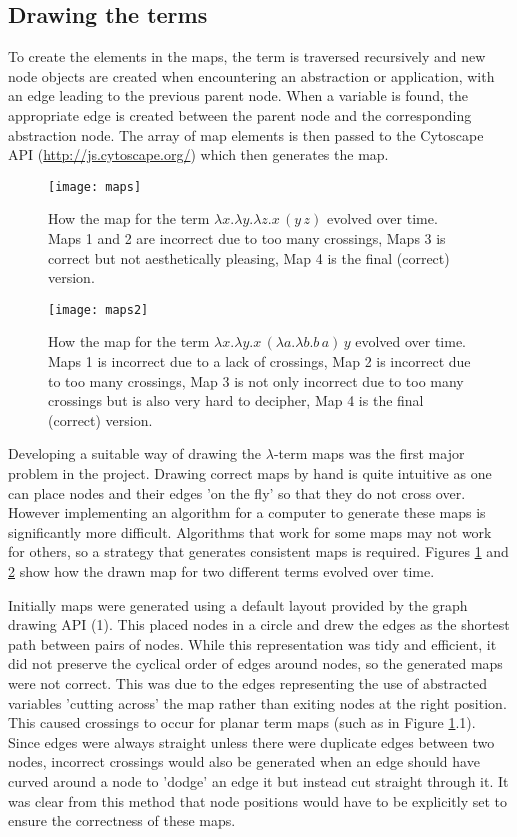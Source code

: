 \documentclass[11pt]{article}
\begin{document}
\subsection{Drawing the terms}

To create the elements in the maps, the term is traversed recursively and new node objects are created when encountering an abstraction or application, with an edge leading to the previous parent node. When a variable is found, the appropriate edge is created between the parent node and the corresponding abstraction node. The array of map elements is then passed to the Cytoscape API (\url{http://js.cytoscape.org/}) which then generates the map.

\begin{figure}
    \centering
    \texttt{[image: maps]}
    \caption{How the map for the term $\lambda x. \lambda y. \lambda z. x \, (y \, z)$ evolved over time. Maps 1 and 2 are incorrect due to too many crossings, Maps 3 is correct but not aesthetically pleasing, Map 4 is the final (correct) version.}
    \label{fig:drawn_maps}
\end{figure}

\begin{figure}
    \centering
    \texttt{[image: maps2]}
    \caption{How the map for the term $\lambda x. \lambda y. x \, (\lambda a. \lambda b. b \, a) \, y$ evolved over time. Maps 1 is incorrect due to a lack of crossings, Map 2 is incorrect due to too many crossings, Map 3 is not only incorrect due to too many crossings but is also very hard to decipher, Map 4 is the final (correct) version.}
    \label{fig:drawn_maps2}
\end{figure}

Developing a suitable way of drawing the $\lambda$-term maps was the first major problem in the project. Drawing correct maps by hand is quite intuitive as one can place nodes and their edges 'on the fly' so that they do not cross over. However implementing an algorithm for a computer to generate these maps is significantly more difficult. Algorithms that work for some maps may not work for others, so a strategy that generates consistent maps is required. Figures \ref{fig:drawn_maps} and \ref{fig:drawn_maps2} show how the drawn map for two different terms evolved over time.

Initially maps were generated using a default layout provided by the graph drawing API (1). This placed nodes in a circle and drew the edges as the shortest path between pairs of nodes. While this representation was tidy and efficient, it did not preserve the cyclical order of edges around nodes, so the generated maps were not correct. This was due to the edges representing the use of abstracted variables 'cutting across' the map rather than exiting nodes at the right position. This caused crossings to occur for planar term maps (such as in Figure \ref{fig:drawn_maps}.1). Since edges were always straight unless there were duplicate edges between two nodes, incorrect crossings would also be generated when an edge should have curved around a node to 'dodge' an edge it but instead cut straight through it. It was clear from this method that node positions would have to be explicitly set to ensure the correctness of these maps.
\end{document}

